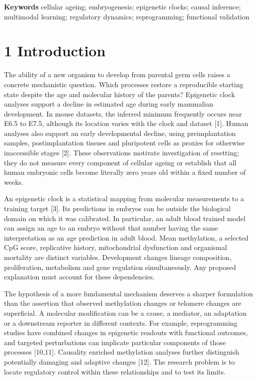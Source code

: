 \documentclass[
  11pt,
  letterpaper,
]{article}
\begin{document}
\textbf{Keywords} cellular ageing; embryogenesis; epigenetic clocks;
causal inference; multimodal learning; regulatory dynamics;
reprogramming; functional validation

\hypertarget{introduction}{%
\section{1 Introduction}\label{introduction}}

The ability of a new organism to develop from parental germ cells raises
a concrete mechanistic question. Which processes restore a reproducible
starting state despite the age and molecular history of the parents?
Epigenetic clock analyses support a decline in estimated age during
early mammalian development. In mouse datasets, the inferred minimum
frequently occurs near E6.5 to E7.5, although its location varies with
the clock and dataset {[}1{]}. Human analyses also support an early
developmental decline, using preimplantation samples, postimplantation
tissues and pluripotent cells as proxies for otherwise inaccessible
stages {[}2{]}. These observations motivate investigation of resetting;
they do not measure every component of cellular ageing or establish that
all human embryonic cells become literally zero years old within a fixed
number of weeks.

An epigenetic clock is a statistical mapping from molecular measurements
to a training target {[}3{]}. Its predictions in embryos can be outside
the biological domain on which it was calibrated. In particular, an
adult blood trained model can assign an age to an embryo without that
number having the same interpretation as an age prediction in adult
blood. Mean methylation, a selected CpG score, replicative history,
mitochondrial dysfunction and organismal mortality are distinct
variables. Development changes lineage composition, proliferation,
metabolism and gene regulation simultaneously. Any proposed explanation
must account for these dependencies.

The hypothesis of a more fundamental mechanism deserves a sharper
formulation than the assertion that observed methylation changes or
telomere changes are superficial. A molecular modification can be a
cause, a mediator, an adaptation or a downstream reporter in different
contexts. For example, reprogramming studies have combined changes in
epigenetic readouts with functional outcomes, and targeted perturbations
can implicate particular components of those processes {[}10,11{]}.
Causality enriched methylation analyses further distinguish potentially
damaging and adaptive changes {[}12{]}. The research problem is to
locate regulatory control within these relationships and to test its
limits.
\end{document}

